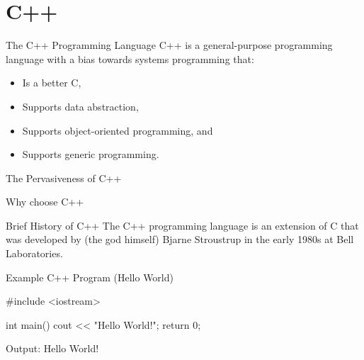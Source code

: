 \documentclass[../lecture1-introduction.tex]{subfiles}
\begin{document}
\section{C++}


\begin{frame}[fragile]{The C++ Programming Language}
    C++ is a general-purpose programming language with a bias towards systems
    programming that:
    \begin{itemize}
        \item Is a better C,
        \item Supports data abstraction,
        \item Supports object-oriented programming, and
        \item Supports generic programming.
    \end{itemize}
\end{frame}


\begin{frame}[fragile]{The Pervasiveness of C++}



\end{frame}


\begin{frame}[fragile]{Why choose C++}



\end{frame}


\begin{frame}[fragile]{Brief History of C++}
    The C++ programming language is an extension of C that was developed by
    (the god himself) Bjarne Stroustrup in the early 1980s at Bell Laboratories.
\end{frame}


\begin{frame}[fragile]{Example C++ Program (Hello World)}
\begin{cppcode}[]
#include <iostream>

int main()
{
    cout << "Hello World!";
    return 0;
}
\end{cppcode}
    Output: Hello World!
\end{frame}

\end{document}
